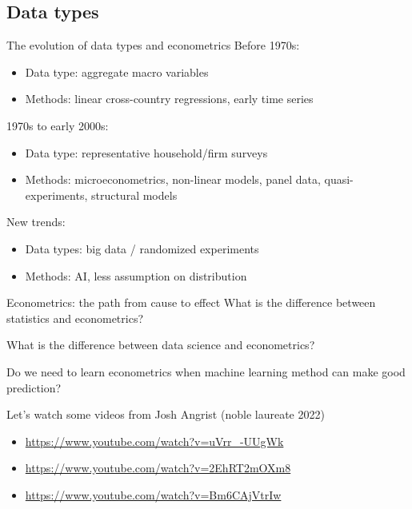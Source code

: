 \documentclass[handout]{beamer}
\begin{document}
\subsection{Data types}

\begin{frame}{The evolution of data types and econometrics}
Before 1970s:
\begin{itemize}
\item Data type: aggregate macro variables
\item Methods: linear cross-country regressions, early time series
\end{itemize}\bigskip\pause

1970s  to early 2000s:
\begin{itemize}
	\item Data type: representative household/firm surveys
	\item Methods: microeconometrics, non-linear models, panel data, quasi-experiments, structural models
\end{itemize}\bigskip

New trends:
\begin{itemize}
	\item Data types: big data / randomized experiments
	\item Methods: AI, less assumption on distribution
\end{itemize}
\end{frame}

\begin{frame}{Econometrics: the path from cause to effect}
	What is the difference between statistics and econometrics?\bigskip
	
	What is the difference between data science and econometrics?\bigskip
	
	Do we need to learn econometrics when machine learning method can make good prediction?\bigskip
	
	Let's watch some videos from Josh Angrist (noble laureate 2022) 
	\begin{itemize}
		\item \url{https://www.youtube.com/watch?v=uVrr_-UUgWk}
		\item \url{https://www.youtube.com/watch?v=2EhRT2mOXm8}
		\item \url{https://www.youtube.com/watch?v=Bm6CAjVtrIw}
	\end{itemize}

\end{frame}
\end{document}
